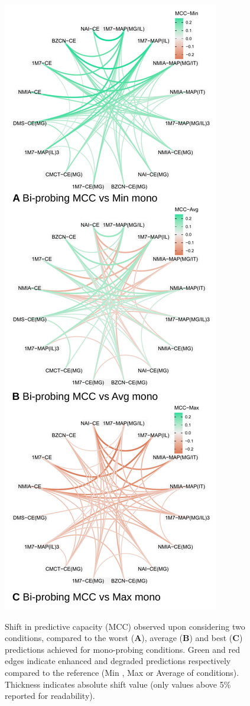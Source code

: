 \documentclass[a4,center,fleqn]{NAR}
\begin{document}
\begin{figure}
	\newcommand{\W}{.7}
	{\centering\includegraphics[width=\W\linewidth]{graphs/didy/pairs-spiders}\\}
	\caption{Shift in \OurTool{} predictive capacity (MCC) observed upon considering two conditions, compared to the worst ({\sf\bfseries A}),  average ({\sf\bfseries B}) 
		and best ({\sf\bfseries C}) 
		predictions achieved for mono-probing conditions. Green and red edges indicate enhanced and degraded predictions respectively compared to the reference (Min%
		, Max 
		or Average of conditions). Thickness indicates absolute shift value (only values above 5\% reported for readability).\label{fig:pairwise}}
\end{figure}
\end{document}
